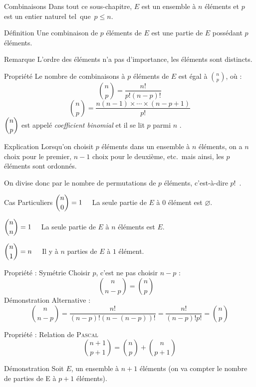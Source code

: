 \documentclass{coursbook}
\begin{document}
    \begin{Gpartie}{Combinaisons}
        Dans tout ce sous-chapitre, $E$ est un ensemble à $n$ éléments et $p$ est un entier naturel tel~que~$p\leq n$.
        \begin{Spartie}{Définition}
            Une combinaison de $p$ éléments de $E$ est une partie de $E$ possédant $p$ éléments.
            \begin{SSpartie}{Remarque}
                L'ordre des éléments n'a pas d'importance, les éléments sont distincts.
            \end{SSpartie}
        \end{Spartie}
        \begin{Spartie}{Propriété}
            Le nombre de combinaisons à $p$ éléments de $E$ est égal à $\binom{n}{p}$, où :
            \[\binom{n}{p}=\dfrac{n!}{p!(n-p)!}\]
            \[\binom{n}{p}=\dfrac{n(n-1)\times\dotsb\times(n-p+1)}{p!}\]
            $\dbinom{n}{p}$ est appelé \emph{coefficient binomial} et il se lit \og $p$ parmi $n$ \fg{}.
            \begin{SSpartie}{Explication}
                Lorsqu'on choisit $p$ éléments dans un ensemble à $n$ éléments, on a $n$ choix pour le premier, $n-1$ choix pour le deuxième, etc.\ mais ainsi, les $p$ éléments sont ordonnés.

                On divise donc par le nombre de permutations de $p$ éléments, c'est-à-dire $p!$~.
            \end{SSpartie}
            \begin{SSpartie}{Cas Particuliers}
                $\dbinom{n}{0}=1\quad$ La seule partie de $E$ à $0$ élément est $\varnothing$.

                $\dbinom{n}{n}=1\quad$ La seule partie de $E$ à $n$ éléments est $E$.

                $\dbinom{n}{1}=n\quad$ Il y à $n$ parties de $E$ à $1$ élément.
            \end{SSpartie}
        \end{Spartie}
        \begin{Spartie}{Propriété : Symétrie}
            Choisir $p$, c'est ne pas choisir $n-p$ :
            \[\binom{n}{n-p}=\binom{n}{p}\quad\]
            Démonstration Alternative : 
            \[\binom{n}{n-p}=\dfrac{n!}{(n-p)!(n-(n-p))!}=\dfrac{n!}{(n-p)!p!}=\binom{n}{p}\]
        \end{Spartie}
        \begin{Spartie}{Propriété : Relation de \textsc{Pascal}}
            \[\binom{n+1}{p+1}=\binom{n}{p}+\binom{n}{p+1}\]
            \begin{SSpartie}{Démonstration}
                Soit $E$, un ensemble à $n+1$ éléments (on va compter le nombre de parties de E à $p+1$ éléments).


\end{SSpartie}
\end{Spartie}
\end{Gpartie}
\end{document}
